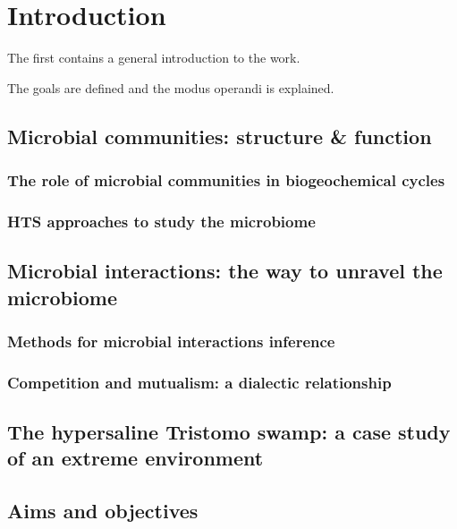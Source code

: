 \chapter{Introduction}
\label{cha:intro}

The first contains a general introduction to the work. 

The goals are defined and the modus operandi is explained.


\section{Microbial communities: structure \& function}

\subsection{The role of microbial communities in biogeochemical cycles}

\subsection{HTS approaches to study the microbiome}


\section{Microbial interactions: the way to unravel the microbiome}

\subsection{Methods for microbial interactions inference}

\subsection{Competition and mutualism: a dialectic relationship}


\section{The hypersaline Tristomo swamp: a case study of an extreme environment}



\section{Aims and objectives}



